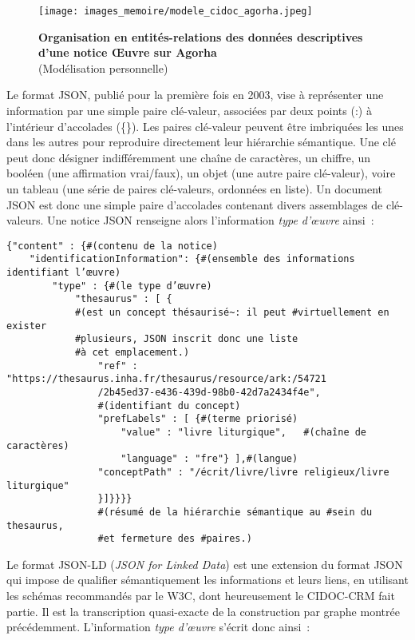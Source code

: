 \documentclass[a4paper,12pt, twoside]{book}
\begin{document}
\begin{figure}[!h]
    \centering    
    \texttt{[image: images\_memoire/modele\_cidoc\_agorha.jpeg]}
    \caption*{\textbf{Organisation en entités-relations des données descriptives d'une notice Œuvre sur Agorha}\\
(Modélisation personnelle)}
    \label{Cidoc-CRM en pagaille.}
\end{figure}

Le format JSON, publié pour la première fois en 2003, vise à représenter une information par une simple paire clé-valeur, associées par deux points (:) à l’intérieur d’accolades (\{\}). Les paires clé-valeur peuvent être imbriquées les unes dans les autres pour reproduire directement leur hiérarchie sémantique. Une clé peut donc désigner indifféremment une chaîne de caractères, un chiffre, un booléen (une affirmation vrai/faux), un objet (une autre paire clé-valeur), voire un tableau (une série de paires clé-valeurs, ordonnées en liste). Un document JSON est donc une simple paire d’accolades contenant divers assemblages de clé-valeurs. Une notice JSON renseigne alors l’information \textit{type d’œuvre} ainsi~:

\begin{verbatim}
{"content" : {#(contenu de la notice)
    "identificationInformation": {#(ensemble des informations identifiant l’œuvre) 
        "type" : {#(le type d’œuvre)
            "thesaurus" : [ {
            #(est un concept thésaurisé~: il peut #virtuellement en exister 
            #plusieurs, JSON inscrit donc une liste 
            #à cet emplacement.)
                "ref" : "https://thesaurus.inha.fr/thesaurus/resource/ark:/54721
                /2b45ed37-e436-439d-98b0-42d7a2434f4e",
                #(identifiant du concept)
                "prefLabels" : [ {#(terme priorisé)
                    "value" : "livre liturgique",   #(chaîne de caractères)
                    "language" : "fre"} ],#(langue)
                "conceptPath" : "/écrit/livre/livre religieux/livre liturgique"
                }]}}}} 
                #(résumé de la hiérarchie sémantique au #sein du thesaurus, 
                #et fermeture des #paires.)
\end{verbatim}

Le format JSON-LD (\emph{JSON for Linked Data}) est une extension du format JSON qui impose de qualifier sémantiquement les informations et leurs liens, en utilisant les schémas recommandés par le W3C, dont heureusement le CIDOC-CRM fait partie. Il est la transcription quasi-exacte de la construction par graphe montrée précédemment. L’information \textit{type d’œuvre} s’écrit donc ainsi~:
\end{document}
